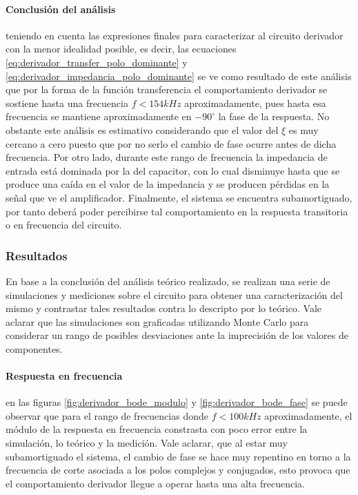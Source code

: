 \paragraph*{Conclusi\'on del an\'alisis} teniendo en cuenta las expresiones finales para caracterizar al circuito derivador con 
la menor idealidad posible, es decir, las ecuaciones \ref{eq:derivador_transfer_polo_dominante} y 
\ref{eq:derivador_impedancia_polo_dominante} se ve como resultado de este an\'alisis que por la forma de la 
funci\'on transferencia el comportamiento derivador se sostiene hasta una frecuencia $f < 154kHz$ aproximadamente, pues hasta esa frecuencia 
se mantiene aproximadamente en $-90^{\circ}$ la fase de la respuesta. No obstante este an\'alisis es estimativo considerando que el valor del $\xi$ es muy cercano a cero puesto
que por no serlo el cambio de fase ocurre antes de dicha frecuencia. Por otro lado, durante este rango de frecuencia la 
 impedancia de entrada est\'a dominada por la del capacitor, con lo cual disminuye hasta que se produce una ca\'ida en el valor 
 de la impedancia y se producen p\'erdidas en la se\~nal que ve el amplificador. Finalmente, el sistema se encuentra subamortiguado, por tanto
 deber\'a poder percibirse tal comportamiento en la respuesta transitoria o en frecuencia del circuito.

\subsubsection{Resultados}
En base a la conclusi\'on del an\'alisis te\'orico realizado, se realizan una serie de simulaciones y mediciones sobre el circuito
para obtener una caracterizaci\'on del mismo y contrastar tales resultados contra lo descripto por lo te\'orico. Vale aclarar que las simulaciones
son graficadas utilizando Monte Carlo para considerar un rango de posibles desviaciones ante la imprecisi\'on de los valores de componentes.

\paragraph*{Respuesta en frecuencia} en las figuras \ref{fig:derivador_bode_modulo} y \ref{fig:derivador_bode_fase} se puede observar
que para el rango de frecuencias donde $f < 100kHz$ aproximadamente, el m\'odulo de la respuesta en frecuencia constrasta con poco error entre
la simulaci\'on, lo te\'orico y la medici\'on. Vale aclarar, que al estar muy subamortiguado el sistema, el cambio de fase se hace muy repentino en torno
a la frecuencia de corte asociada a los polos complejos y conjugados, esto provoca que el comportamiento derivador llegue a operar hasta una alta frecuencia.

